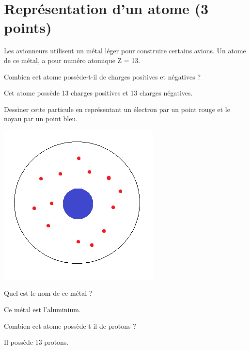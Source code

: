 \section{Représentation d'un atome (3 points)}\label{ex:avions}

Les avionneurs utilisent un métal léger pour construire certains avions. Un atome de ce métal, a pour numéro atomique Z = 13.

\begin{questions}
	\question[1] Combien cet atome possède-t-il de charges positives et négatives ?
	
	\begin{solution}
		Cet atome possède 13 charges positives et 13 charges négatives.
	\end{solution}
	
	\question[1] Dessiner cette particule en représentant un électron par un point rouge et le noyau par un point bleu.
	
	\begin{solution}
		\begin{center}
			\includegraphics[scale=0.5]{img/al}
		\end{center}
	\end{solution}
	
	\question[1] Quel est le nom de ce métal ?
		\begin{solution}
			Ce métal est l'aluminium.
		\end{solution}
	
	\question[1] Combien cet atome possède-t-il de protons ?
	\begin{solution}
		Il possède 13 protons.
	\end{solution}
\end{questions}